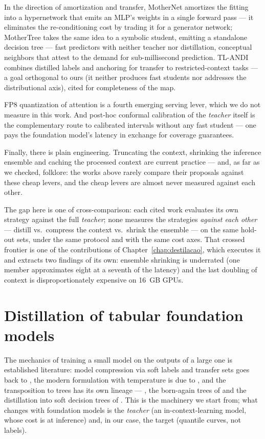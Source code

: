 In the direction of amortization and transfer, MotherNet
\citep{mothernet2023} amortizes the fitting into a hypernetwork
that emits an MLP's weights in a single forward pass --- it
eliminates the re-conditioning cost by trading it for a generator
network; MotherTree \citep{mothertree2026} takes the same idea to a
symbolic student, emitting a standalone decision tree --- fast
predictors with neither teacher nor distillation, conceptual
neighbors that attest to the demand for sub-millisecond prediction.
TL-ANDI \citep{tlandi2026} combines distilled labels and anchoring
for transfer to restricted-context tasks --- a goal orthogonal to
ours (it neither produces fast students nor addresses the
distributional axis), cited for completeness of the map.

FP8 quantization of attention \citep{kubler2026} is a fourth
emerging serving lever, which we do not measure in this work. And
post-hoc conformal calibration of the \emph{teacher} itself
\citep{park2026} is the complementary route to calibrated intervals
without any fast student --- one pays the foundation model's
latency in exchange for coverage guarantees.

Finally, there is plain engineering. Truncating the context,
shrinking the inference ensemble and caching the processed context
are current practice --- and, as far as we checked, folklore: the
works above rarely compare their proposals against these cheap
levers, and the cheap levers are almost never measured against each
other.

The gap here is one of cross-comparison: each cited work evaluates
its own strategy against the full \emph{teacher}; none measures the
strategies \emph{against each other} --- distill vs.\ compress the
context vs.\ shrink the ensemble --- on the same hold-out sets,
under the same protocol and with the same cost axes. That crossed
frontier is one of the contributions of
Chapter~\ref{chap:destilacao}, which executes it and extracts two
findings of its own: ensemble shrinking is underrated (one member
approximates eight at a seventh of the latency) and the last
doubling of context is disproportionately expensive on 16~GB GPUs.

\section{Distillation of tabular foundation models}
\label{sec:rel-destilacao}

The mechanics of training a small model on the outputs of a large
one is established literature: model compression via soft labels
and transfer sets goes back to \citet{bucila2006}, the modern
formulation with temperature is due to \citet{hinton2015}, and the
transposition to trees has its own lineage --- \citet{breiman1996},
the born-again trees of \citet{vidal2020} and the distillation into
soft decision trees of \citet{frosst2017}. This is the machinery we
start from; what changes with foundation models is the
\emph{teacher} (an in-context-learning model, whose cost is at
inference) and, in our case, the target (quantile curves, not
labels).

